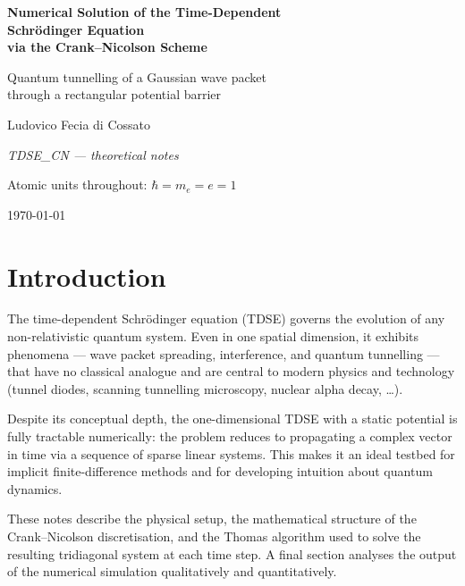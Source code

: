 \documentclass[12pt, a4paper]{article}
\newcommand{\CN}{Crank--Nicolson}
\begin{document}
\begin{titlepage}
  \centering
  \vspace*{3cm}
  {\LARGE\bfseries Numerical Solution of the Time-Dependent\\[6pt]
   Schr\"{o}dinger Equation\\[4pt]
   via the Crank--Nicolson Scheme\par}
  \vspace{1.5cm}
  {\large Quantum tunnelling of a Gaussian wave packet\\
   through a rectangular potential barrier\par}
  \vspace{2cm}
  {\large Ludovico Fecia di Cossato\par}
  \vfill
  {\large\itshape TDSE\_CN — theoretical notes\par}
  \vspace{0.5cm}
  {\normalsize Atomic units throughout: $\hbar = m_e = e = 1$\par}
  \vspace{1cm}
  {\normalsize \today\par}
\end{titlepage}

\tableofcontents
\newpage

\section{Introduction}

The time-dependent Schr\"{o}dinger equation (TDSE) governs the evolution of
any non-relativistic quantum system.  Even in one spatial dimension, it
exhibits phenomena — wave packet spreading, interference, and quantum
tunnelling — that have no classical analogue and are central to modern
physics and technology (tunnel diodes, scanning tunnelling microscopy,
nuclear alpha decay, \ldots).

Despite its conceptual depth, the one-dimensional TDSE with a static
potential is fully tractable numerically: the problem reduces to propagating
a complex vector in time via a sequence of sparse linear systems.  This
makes it an ideal testbed for implicit finite-difference methods and for
developing intuition about quantum dynamics.

These notes describe the physical setup, the mathematical structure of the
\CN{} discretisation, and the Thomas algorithm used to solve the resulting
tridiagonal system at each time step.  A final section analyses the output
of the numerical simulation qualitatively and quantitatively.
\end{document}
